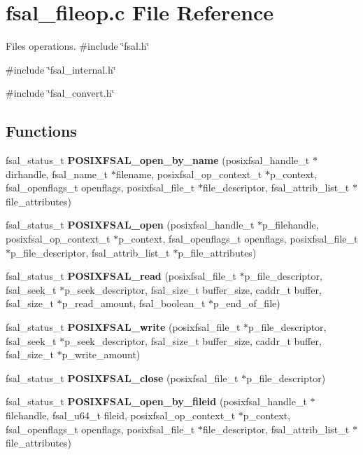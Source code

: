 \section{fsal\_\-fileop.c File Reference}
\label{fsal__fileop_8c}


Files operations.  
{\ttfamily \#include \char`\"{}fsal.h\char`\"{}}\par
{\ttfamily \#include \char`\"{}fsal\_\-internal.h\char`\"{}}\par
{\ttfamily \#include \char`\"{}fsal\_\-convert.h\char`\"{}}\par
\subsection*{Functions}
\begin{DoxyCompactItemize}
\item 
fsal\_\-status\_\-t {\bf POSIXFSAL\_\-open\_\-by\_\-name} (posixfsal\_\-handle\_\-t $\ast$dirhandle, fsal\_\-name\_\-t $\ast$filename, posixfsal\_\-op\_\-context\_\-t $\ast$p\_\-context, fsal\_\-openflags\_\-t openflags, posixfsal\_\-file\_\-t $\ast$file\_\-descriptor, fsal\_\-attrib\_\-list\_\-t $\ast$file\_\-attributes)
\item 
fsal\_\-status\_\-t {\bf POSIXFSAL\_\-open} (posixfsal\_\-handle\_\-t $\ast$p\_\-filehandle, posixfsal\_\-op\_\-context\_\-t $\ast$p\_\-context, fsal\_\-openflags\_\-t openflags, posixfsal\_\-file\_\-t $\ast$p\_\-file\_\-descriptor, fsal\_\-attrib\_\-list\_\-t $\ast$p\_\-file\_\-attributes)
\item 
fsal\_\-status\_\-t {\bf POSIXFSAL\_\-read} (posixfsal\_\-file\_\-t $\ast$p\_\-file\_\-descriptor, fsal\_\-seek\_\-t $\ast$p\_\-seek\_\-descriptor, fsal\_\-size\_\-t buffer\_\-size, caddr\_\-t buffer, fsal\_\-size\_\-t $\ast$p\_\-read\_\-amount, fsal\_\-boolean\_\-t $\ast$p\_\-end\_\-of\_\-file)
\item 
fsal\_\-status\_\-t {\bf POSIXFSAL\_\-write} (posixfsal\_\-file\_\-t $\ast$p\_\-file\_\-descriptor, fsal\_\-seek\_\-t $\ast$p\_\-seek\_\-descriptor, fsal\_\-size\_\-t buffer\_\-size, caddr\_\-t buffer, fsal\_\-size\_\-t $\ast$p\_\-write\_\-amount)
\item 
fsal\_\-status\_\-t {\bf POSIXFSAL\_\-close} (posixfsal\_\-file\_\-t $\ast$p\_\-file\_\-descriptor)
\item 
fsal\_\-status\_\-t {\bfseries POSIXFSAL\_\-open\_\-by\_\-fileid} (posixfsal\_\-handle\_\-t $\ast$filehandle, fsal\_\-u64\_\-t fileid, posixfsal\_\-op\_\-context\_\-t $\ast$p\_\-context, fsal\_\-openflags\_\-t openflags, posixfsal\_\-file\_\-t $\ast$file\_\-descriptor, fsal\_\-attrib\_\-list\_\-t $\ast$file\_\-attributes)\label{fsal__fileop_8c_a53006139e77cf510d85cffe2f97f7857}


\end{DoxyCompactItemize}
